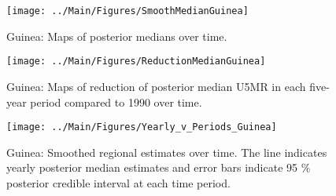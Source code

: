 \documentclass[12pt]{article}\usepackage[]{graphicx}\usepackage[]{color}
\newenvironment{knitrout}{}{} %
\begin{document}
\begin{knitrout}
\color{fgcolor}\begin{figure}[bht]

{\centering \texttt{[image: ../Main/Figures/SmoothMedianGuinea]} 

}

\caption[Guinea]{Guinea: Maps of posterior medians over time.}\label{fig:unnamed-chunk-154}
\end{figure}


\end{knitrout}
\begin{knitrout}
\color{fgcolor}\begin{figure}[bht]

{\centering \texttt{[image: ../Main/Figures/ReductionMedianGuinea]} 

}

\caption[Guinea]{Guinea: Maps of reduction of posterior median U5MR in each five-year period compared to 1990 over time.}\label{fig:unnamed-chunk-155}
\end{figure}


\end{knitrout}
\begin{knitrout}
\color{fgcolor}\begin{figure}[bht]

{\centering \texttt{[image: ../Main/Figures/Yearly\_v\_Periods\_Guinea]} 

}

\caption[Guinea]{Guinea: Smoothed regional estimates over time. The line indicates yearly posterior median estimates and error bars indicate 95 \% posterior credible interval at each time period.}\label{fig:unnamed-chunk-156}
\end{figure}


\end{knitrout}
\end{document}
